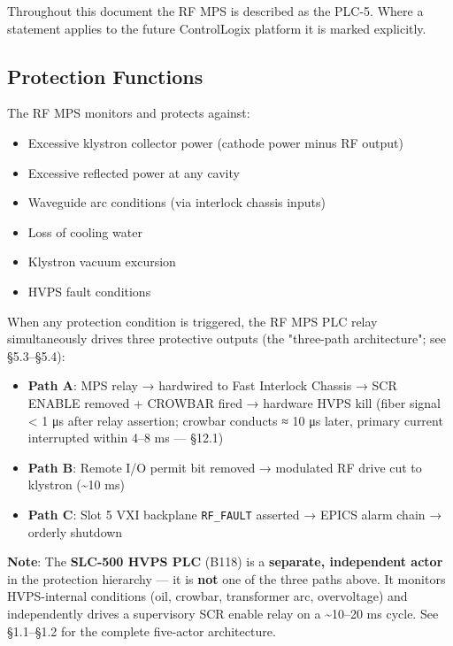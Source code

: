 \begin{keynote}
Throughout this document the RF MPS is described as the PLC-5. Where a statement applies to the future ControlLogix platform it is marked explicitly.
\end{keynote}

\subsection{Protection Functions}

The RF MPS monitors and protects against:

\begin{itemize}
\tightlist
\item
  Excessive klystron collector power (cathode power minus RF output)
\item
  Excessive reflected power at any cavity
\item
  Waveguide arc conditions (via interlock chassis inputs)
\item
  Loss of cooling water
\item
  Klystron vacuum excursion
\item
  HVPS fault conditions
\end{itemize}

When any protection condition is triggered, the RF MPS PLC relay simultaneously drives three protective outputs (the "three-path architecture"; see  §5.3--§5.4):

\begin{itemize}
\tightlist
\item
  \textbf{Path A}: MPS relay → hardwired to Fast Interlock Chassis → SCR ENABLE removed + CROWBAR fired → hardware HVPS kill (fiber signal \textless{} 1 μs after relay assertion; crowbar conducts ≈ 10 μs later, primary current interrupted within 4--8 ms --- §12.1)
\item
  \textbf{Path B}: Remote I/O permit bit removed → modulated RF drive cut to klystron (\textasciitilde10 ms)
\item
  \textbf{Path C}: Slot 5 VXI backplane \texttt{RF\_FAULT} asserted → EPICS alarm chain → orderly shutdown
\end{itemize}

\begin{keynote}
\textbf{Note}: The \textbf{SLC-500 HVPS PLC} (B118) is a \textbf{separate, independent actor} in the protection hierarchy --- it is \textbf{not} one of the three paths above. It monitors HVPS-internal conditions (oil, crowbar, transformer arc, overvoltage) and independently drives a supervisory SCR enable relay on a \textasciitilde10--20 ms cycle. See  §1.1--§1.2 for the complete five-actor architecture.
\end{keynote}

